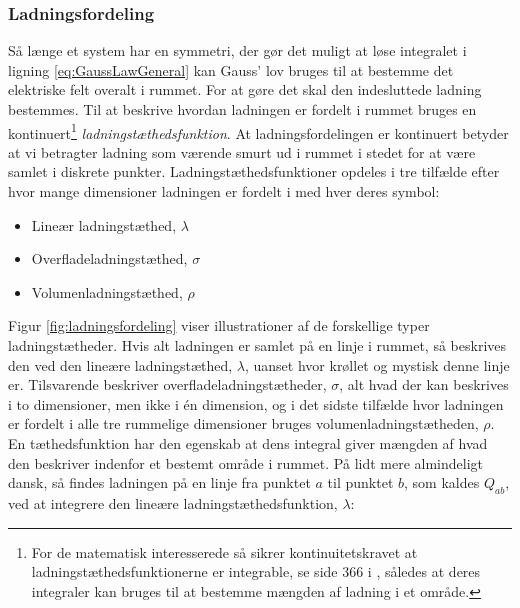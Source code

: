 \subsubsection{Ladningsfordeling}
Så længe et system har en symmetri, der gør det muligt at løse integralet i ligning \eqref{eq:GaussLawGeneral} kan Gauss' lov bruges til at bestemme det elektriske felt overalt i rummet. For at gøre det skal den indesluttede ladning bestemmes. Til at beskrive hvordan ladningen er fordelt i rummet bruges en kontinuert\footnote{For de matematisk interesserede så sikrer kontinuitetskravet at ladningstæthedsfunktionerne er integrable, se side 366 i \cite{stewartCalculusConceptsContexts2006}, således at deres integraler kan bruges til at bestemme mængden af ladning i et område.} \textit{ladningstæthedsfunktion}. At ladningsfordelingen er kontinuert betyder at vi betragter ladning som værende smurt ud i rummet i stedet for at være samlet i diskrete punkter. Ladningstæthedsfunktioner opdeles i tre tilfælde efter hvor mange dimensioner ladningen er fordelt i med hver deres symbol:
%
\begin{itemize}
    \item Lineær ladningstæthed, $\lambda$
    \item Overfladeladningstæthed, $\sigma$
    \item Volumenladningstæthed, $\rho$
\end{itemize}
%
Figur \ref{fig:ladningsfordeling} viser illustrationer af de forskellige typer ladningstætheder. Hvis alt ladningen er samlet på en linje i rummet, så beskrives den ved den lineære ladningstæthed, $\lambda$, uanset hvor krøllet og mystisk denne linje er. Tilsvarende beskriver overfladeladningstætheder, $\sigma$, alt hvad der kan beskrives i to dimensioner, men ikke i én dimension, og i det sidste tilfælde hvor ladningen er fordelt i alle tre rummelige dimensioner bruges volumenladningstætheden, $\rho$. En tæthedsfunktion har den egenskab at dens integral giver mængden af hvad den beskriver indenfor et bestemt område i rummet. På lidt mere almindeligt dansk, så findes ladningen på en linje fra punktet $a$ til punktet $b$, som kaldes $Q_{ab}$, ved at integrere den lineære ladningstæthedsfunktion, $\lambda$:
%
